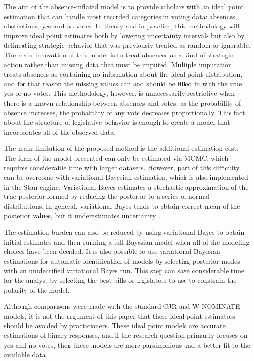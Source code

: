 	The aim of the absence-inflated model is to provide scholars with an ideal point estimation that can handle most recorded categories in voting data: absences, abstentions, yes and no votes. In theory and in practice, this methodology will improve ideal point estimates both by lowering uncertainty intervals but also by delineating strategic behavior that was previously treated as random or ignorable. The main innovation of this model is to treat absences as a kind of strategic action rather than missing data that must be imputed. Multiple imputation treats absences as containing no information about the ideal point distribution, and for that reason the missing values can and should be filled in with the true yes or no votes. This methodology, however, is unnecessarily restrictive when there is a known relationship between absences and votes: as the probability of absence increases, the probability of any vote decreases proportionally. This fact about the structure of legislative behavior is enough to create a model that incorporates all of the observed data. 
	
	The main limitation of the proposed method is the additional estimation cost. The form of the model presented can only be estimated via MCMC, which requires considerable time with larger datasets. However, part of this difficulty can be overcome with variational Bayesian estimation, which is also implemented in the Stan engine. Variational Bayes estimates a stochastic approximation of the true posterior formed by reducing the posterior to a series of normal distributions. In general, variational Bayes tends to obtain correct mean of the posterior values, but it underestimates uncertainty \parencite{NIPS2015_5758}.
	
	The estimation burden can also be reduced by using variational Bayes to obtain initial estimates and then running a full Bayesian model when all of the modeling choices have been decided. It is also possible to use variational Bayesian estimations for automatic identification of models by selecting posterior modes with an unidentified variational Bayes run. This step can save considerable time for the analyst by selecting the best bills or legislators to use to constrain the polarity of the model. 
	
	Although comparisons were made with the standard CJR and W-NOMINATE models, it is not the argument of this paper that these ideal point estimators should be avoided by practicioners. These ideal point models are accurate estimations of binary responses, and if the research question primarily focuses on yes and no votes, then these models are more parsimonious and a better fit to the available data.
	
